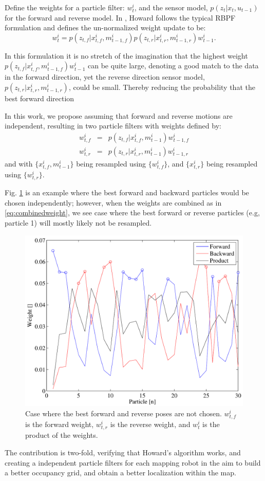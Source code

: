 Define the weights for a particle filter: $w_t^i$, and the sensor model, $p(z_t|x_t,u_{t-1})$ for the forward and reverse model.  In \cite{howard2006multi}, Howard follows the typical RBPF formulation and defines the un-normalized weight update to be:
\begin{equation}
w^i_t=p(z_{t,f}|x_{t,f}^i,m_{t-1,f}^i) p(z_{t,r}|x_{t,r}^i,m_{t-1,r}^i) w^i_{t-1}.
\label{eq:combinedweight}
\end{equation}

In this formulation it is no stretch of the imagination that the highest weight $p(z_{t,f}|x_{t,f}^i,m_{t-1,f}^i) w^i_{t-1}$ can be quite large, denoting a good match to the data in the forward direction, yet the reverse direction sensor model, $p(z_{t,r}|x_{t,r}^i,m_{t-1,r}^i)$, could be small.  Thereby reducing the probability that the best forward direction


In this work, we propose assuming that forward and reverse motions are independent, resulting in two particle filters with weights defined by:
\begin{eqnarray}
w^i_{t,f}&=&p(z_{t,f}|x_{t,f}^i,m_{t-1}^i)  w^i_{t-1,f}\\
w^i_{t,r}&=&p(z_{t,r}|x_{t,r}^i,m_{t-1}^i)  w^i_{t-1,r}
\end{eqnarray}
and with $\{x_{t,f}^i,m_{t-1}^i\}$ being resampled using $\{w^i_{t,f}\}$, and $\{x_{t,r}^i\}$ being resampled using $\{w^i_{t,r}\}$.  

Fig. \ref{fig:deplete} is an example where the best forward and backward particles would be chosen independently; however, when the weights are combined as in \eqref{eq:combinedweight}, we see case where the best forward or reverse particles (e.g, particle 1) will mostly likely not be resampled.

\begin{figure}[h]
\centering
\includegraphics[width=\columnwidth]{../FinalFigures/Depletion}
\caption{Case where the best forward and reverse poses are not chosen. $w^i_{t,f}$ is the forward weight, $w^i_{t,r}$ is the reverse weight, and $w^i_t$ is the product of the weights.}
\label{fig:deplete}
\end{figure}

The contribution is two-fold, verifying that Howard's algorithm works, and creating a independent particle filters for each mapping robot in the aim to build a better occupancy grid, and obtain a better localization within the map.

